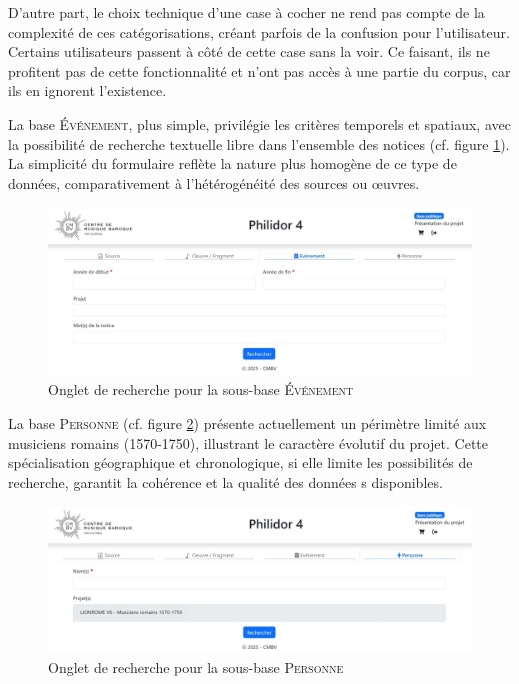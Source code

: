 D'autre part, le choix technique d'une case à cocher ne rend pas compte de la complexité de ces catégorisations, créant parfois de la confusion pour l'utilisateur. Certains utilisateurs passent à côté de cette case sans la voir. Ce faisant, ils ne profitent pas de cette fonctionnalité et n'ont pas accès à une partie du corpus, car ils en ignorent l'existence.

La base \textsc{Événement}, plus simple, privilégie les critères temporels et spatiaux, avec la possibilité de recherche textuelle libre dans l'ensemble des notices (cf. figure \ref{formulaire_evenement}). La simplicité du formulaire reflète la nature plus homogène de ce type de données, comparativement à l'hétérogénéité des sources ou œuvres.

\begin{figure}[h]
	\caption{Onglet de recherche pour la sous-base \textsc{Événement}} \label{formulaire_evenement}
	\centering
	\includegraphics[width=\textwidth]{images/Capture_ecran_onglet_evenements_philidor4.jpeg}
\end{figure}

La base \textsc{Personne} (cf. figure \ref{formulaire_personne}) présente actuellement un périmètre limité aux musiciens romains (1570-1750), illustrant le caractère évolutif du projet. Cette spécialisation géographique et chronologique, si elle limite les possibilités de recherche, garantit la cohérence et la qualité des données s disponibles.

\begin{figure}[h]
	\caption{Onglet de recherche pour la sous-base \textsc{Personne}} \label{formulaire_personne}
	\centering
	\includegraphics[width=\textwidth]{images/Capture_ecran_onglet_personnes_philidor4.jpeg}
\end{figure}

